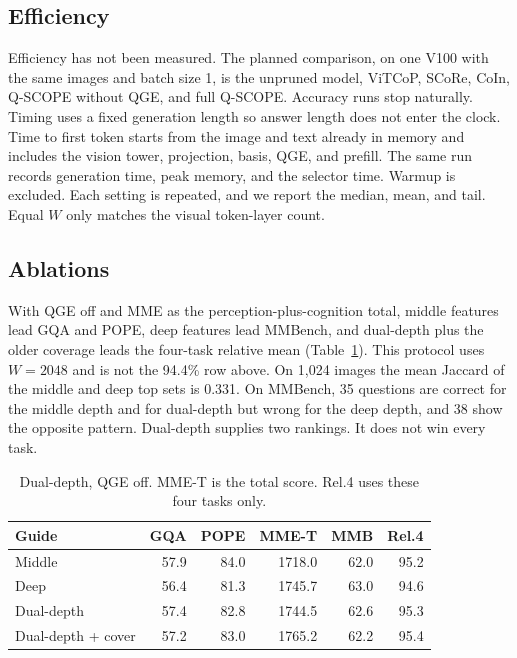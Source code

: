 \subsection{Efficiency}
Efficiency has not been measured. The planned comparison, on one V100 with the same images and batch size 1, is the unpruned model, ViTCoP, SCoRe, CoIn, Q-SCOPE without QGE, and full Q-SCOPE. Accuracy runs stop naturally. Timing uses a fixed generation length so answer length does not enter the clock. Time to first token starts from the image and text already in memory and includes the vision tower, projection, basis, QGE, and prefill. The same run records generation time, peak memory, and the selector time. Warmup is excluded. Each setting is repeated, and we report the median, mean, and tail. Equal $W$ only matches the visual token-layer count.

\subsection{Ablations}
With QGE off and MME as the perception-plus-cognition total, middle features lead GQA and POPE, deep features lead MMBench, and dual-depth plus the older coverage leads the four-task relative mean (Table~\ref{tab:depth}). This protocol uses $W{=}2048$ and is not the 94.4\% row above. On 1,024 images the mean Jaccard of the middle and deep top sets is 0.331. On MMBench, 35 questions are correct for the middle depth and for dual-depth but wrong for the deep depth, and 38 show the opposite pattern. Dual-depth supplies two rankings. It does not win every task.

\begin{table}[t]
\centering
\scriptsize
\setlength{\tabcolsep}{3pt}
\caption{Dual-depth, QGE off. MME-T is the total score. Rel.4 uses these four tasks only.}
\label{tab:depth}
\begin{tabular}{@{}lrrrrr@{}}
\hline
Guide & GQA & POPE & MME-T & MMB & Rel.4 \\
\hline
Middle & 57.9 & 84.0 & 1718.0 & 62.0 & 95.2 \\
Deep & 56.4 & 81.3 & 1745.7 & 63.0 & 94.6 \\
Dual-depth & 57.4 & 82.8 & 1744.5 & 62.6 & 95.3 \\
Dual-depth + cover & 57.2 & 83.0 & 1765.2 & 62.2 & 95.4 \\
\hline
\end{tabular}
\end{table}

